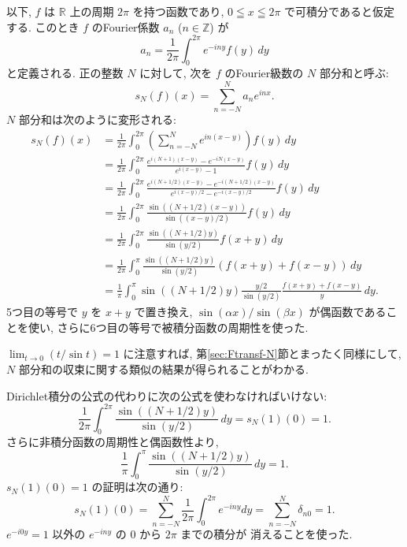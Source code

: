 \documentclass[12pt,twoside]{jarticle}
\newcommand\Z{{\mathbb Z}} %
\newcommand\R{{\mathbb R}} %
\theoremstyle{jplain}
\theoremstyle{jplain}
\theoremstyle{jplain}
\numberwithin{theorem}{section}
\numberwithin{equation}{section}
\numberwithin{figure}{section}
\numberwithin{table}{section}
\newcommand\secref[1]{第\ref{#1}節}
\begin{document}
以下, $f$ は $\R$ 上の周期 $2\pi$ を持つ函数であり, 
$0\leqq x\leqq 2\pi$ で可積分であると仮定する.
このとき $f$ のFourier係数 $a_n$ ($n\in\Z$) が
\[
a_n = \frac{1}{2\pi}\int_0^{2\pi} e^{-iny}f(y)\,dy
\]
と定義される. 正の整数 $N$ に対して, 
次を $f$ のFourier級数の $N$ 部分和と呼ぶ:
\[
s_N(f)(x) = \sum_{n=-N}^N a_n e^{inx}.
\]
$N$ 部分和は次のように変形される:
\begin{align*}
s_N(f)(x)
&=\frac{1}{2\pi}\int_0^{2\pi}
\left(\sum_{n=-N}^N e^{in(x-y)}\right) f(y)\,dy
\\ &
=\frac{1}{2\pi}\int_0^{2\pi}
\frac{e^{i(N+1)(x-y)}-e^{-iN(x-y)}}{e^{i(x-y)}-1} f(y)\,dy
\\ &
=\frac{1}{2\pi}\int_0^{2\pi}
\frac{e^{i(N+1/2)(x-y)}-e^{-i(N+1/2)(x-y)}}{e^{i(x-y)/2}-e^{-i(x-y)/2}} f(y)\,dy
\\ &
=\frac{1}{2\pi}\int_0^{2\pi}
\frac{\sin((N+1/2)(x-y))}{\sin((x-y)/2)} f(y)\,dy
\\ &
=\frac{1}{2\pi}\int_0^{2\pi}
\frac{\sin((N+1/2)y)}{\sin(y/2)}f(x+y)\,dy
\\ &
=\frac{1}{2\pi}\int_0^{\pi}
\frac{\sin((N+1/2)y)}{\sin(y/2)}(f(x+y)+f(x-y))\,dy
\\ &
=\frac{1}{\pi}\int_0^{\pi}
\sin((N+1/2)y)\frac{y/2}{\sin(y/2)}\frac{f(x+y)+f(x-y)}{y}\,dy.
\end{align*}
5つ目の等号で $y$ を $x+y$ で置き換え, 
$\sin(\alpha x)/\sin(\beta x)$ が偶函数であることを使い,
さらに6つ目の等号で被積分函数の周期性を使った.

$\lim_{t\to 0}(t/\sin t)=1$ に注意すれば, 
\secref{sec:Ftransf-N}とまったく同様にして, 
$N$ 部分和の収束に関する類似の結果が得られることがわかる.


Dirichlet積分の公式の代わりに次の公式を使わなければいけない:
\[
\frac{1}{2\pi}\int_0^{2\pi}
\frac{\sin((N+1/2)y)}{\sin(y/2)}\,dy
= s_N(1)(0)=1.
\]
さらに非積分函数の周期性と偶函数性より,
\[
\frac{1}{\pi}\int_0^{\pi}\frac{\sin((N+1/2)y)}{\sin(y/2)}\,dy
= 1.
\]
$s_N(1)(0)=1$ の証明は次の通り:
\[
s_N(1)(0)
=\sum_{n=-N}^N \frac{1}{2\pi}\int_0^{2\pi}e^{-iny}dy
=\sum_{n=-N}^N \delta_{n0}
=1.
\]
$e^{-i0y}=1$ 以外の $e^{-iny}$ の $0$ から $2\pi$ までの積分が
消えることを使った.
\end{document}

